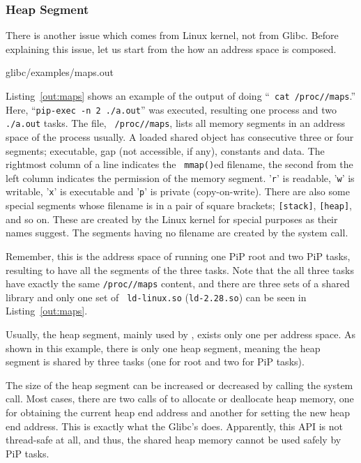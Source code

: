 \subsubsection{Heap Segment}\label{sec:heap}

There is another issue which comes from Linux kernel, not from
Glibc. Before explaining this issue, let us start from the how an
address space is composed. 

 {glibc/examples/maps.out}

Listing~\ref{out:maps} shows an example of the output of doing ``{\tt
  cat /proc//maps}.'' Here, ``{\tt pip-exec -n 2
  ./a.out}'' was executed, resulting one  process
and two {\tt ./a.out} tasks. The file, {\tt
  /proc//maps}, lists all memory
segments in an address space of the process {\tt {}}
usually. A loaded shared object has consecutive three or four segments; 
executable, gap (not accessible, if any), constants and data. 
The rightmost column of a line indicates the {\tt
  mmap()}ed filename, the second from the left column indicates the
permission of the memory segment. '{\tt r}' is readable, '{\tt w}' is
writable, '{\tt x}' is executable and '{\tt p}' is private
(copy-on-write). There are also some special segments whose filename
is in a pair of square brackets; {\tt [stack]}, {\tt [heap]}, and so
on. These are created by the Linux kernel for special purposes as
their names suggest. The segments having no filename are created by
the  system call. 

Remember, this is the address space of running one PiP root and two PiP
tasks, resulting to have all the segments of the three tasks.
Note that the all three tasks have
exactly the same {\tt /proc//maps} content, and
there are three sets of a shared library and only one set of {\tt
  ld-linux.so} ({\tt ld-2.28.so}) can be seen in
Listing~\ref{out:maps}.

Usually, the heap segment, mainly used by , exists only
one per address space. As shown in this example, there is only one heap
segment, meaning the heap segment is shared by three tasks (one for
root and two for PiP tasks). 

The size of the heap segment can be increased or decreased by calling
the  system call. Most cases, there are two calls of
 to allocate or deallocate heap memory, one for
obtaining the 
current heap end address and another for setting the new heap end 
address. This is exactly what the Glibc's 
does. Apparently, this API is not thread-safe at all, and thus, 
the shared heap memory cannot be used safely by PiP tasks.

